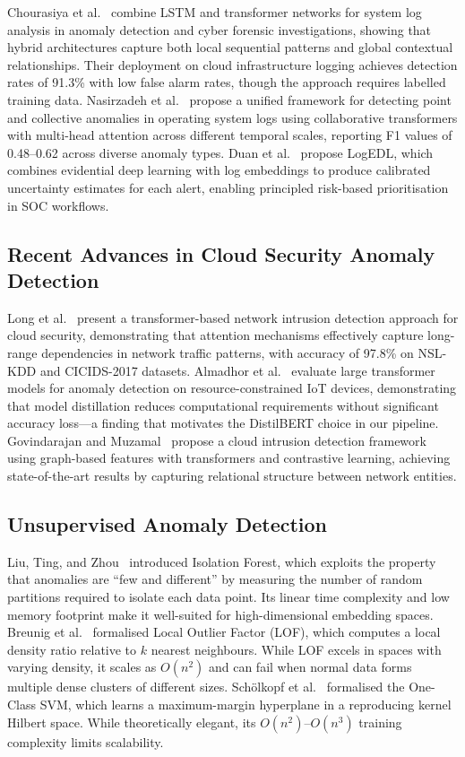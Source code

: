 \documentclass[conference]{IEEEtran}
\begin{document}
Chourasiya et al.~\cite{chourasiya2025} combine LSTM and transformer
networks for system log analysis in anomaly detection and cyber forensic
investigations, showing that hybrid architectures capture both local
sequential patterns and global contextual relationships.  Their deployment on
cloud infrastructure logging achieves detection rates of 91.3\% with low
false alarm rates, though the approach requires labelled training data.
Nasirzadeh et al.~\cite{nasirzadeh2025} propose a unified framework for
detecting point and collective anomalies in operating system logs using
collaborative transformers with multi-head attention across different temporal
scales, reporting F1 values of 0.48--0.62 across diverse anomaly types.
Duan et al.~\cite{duan2024} propose LogEDL, which combines evidential deep
learning with log embeddings to produce calibrated uncertainty estimates for
each alert, enabling principled risk-based prioritisation in SOC workflows.

\subsection{Recent Advances in Cloud Security Anomaly Detection}

Long et al.~\cite{long2024} present a transformer-based network intrusion
detection approach for cloud security, demonstrating that attention mechanisms
effectively capture long-range dependencies in network traffic patterns, with
accuracy of 97.8\% on NSL-KDD and CICIDS-2017 datasets.  Almadhor
et al.~\cite{almadhor2025} evaluate large transformer models for anomaly
detection on resource-constrained IoT devices, demonstrating that model
distillation reduces computational requirements without significant accuracy
loss---a finding that motivates the DistilBERT choice in our pipeline.
Govindarajan and Muzamal~\cite{govindarajan2025} propose a cloud intrusion
detection framework using graph-based features with transformers and
contrastive learning, achieving state-of-the-art results by capturing
relational structure between network entities.

\subsection{Unsupervised Anomaly Detection}

Liu, Ting, and Zhou~\cite{liu2008} introduced Isolation Forest, which
exploits the property that anomalies are ``few and different'' by measuring
the number of random partitions required to isolate each data point.  Its
linear time complexity and low memory footprint make it well-suited for
high-dimensional embedding spaces.  Breunig et al.~\cite{breunig2000}
formalised Local Outlier Factor (LOF), which computes a local density ratio
relative to $k$ nearest neighbours.  While LOF excels in spaces with varying
density, it scales as $O(n^2)$ and can fail when normal data forms multiple
dense clusters of different sizes.  Sch\"{o}lkopf et al.~\cite{scholkopf2001}
formalised the One-Class SVM, which learns a maximum-margin hyperplane in a
reproducing kernel Hilbert space.  While theoretically elegant, its
$O(n^2)$--$O(n^3)$ training complexity limits scalability.
\end{document}
